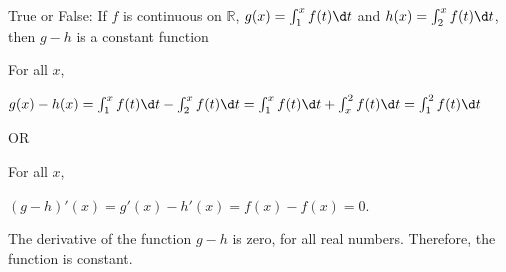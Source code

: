 \documentclass{ximera}
\author{Steven Gubkin}
\begin{document}
\begin{exercise}

True or False:  If  $f$ is continuous on $\mathbb{R}$,  $g(x)= \int_1^{x} f(t) \d t$ and  $h(x)= \int_2^x f(t) \d t$, then $g-h$ is a constant function

\begin{hint}
For all $x$,


 $g(x)-h(x)=\int_1^{x} f(t) \d t- \int_2^x f(t) \d t=\int_1^{x} f(t) \d t+ \int_x^2 f(t) \d t=\int_1^{2} f(t) \d t$
 
 OR
 
 
 For all $x$,
 
 
 $(g-h)'(x)=g'(x)-h'(x)=f(x)-f(x)=0$.
 
 
 The derivative of the function $g-h$ is zero, for all real numbers. Therefore, the function is constant.
\end{hint}
\begin{prompt}
	\begin{multipleChoice}
	\end{multipleChoice}
\end{prompt}

\end{exercise}
\end{document}
